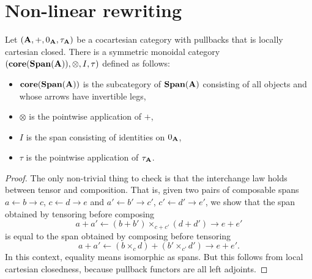 \documentclass[master]{subfiles}
\begin{document}
         

\section{Non-linear rewriting} 
\label{sec_nonlinear-rewriting}


\begin{lem} \label{thm_nlr_dble-rewrite-obcat}
	Let $ (\mathbf{A} , + , 0_{\mathbf{A}} , \tau_{\mathbf{A}} ) $ be a cocartesian category with pullbacks that is locally cartesian closed. There is a symmetric monoidal category $ ( \mathbf{core} (\mathbf{Span} (\mathbf{A})) , \otimes , I , \tau ) $ defined as follows:
	\begin{itemize}
		\item $ \mathbf{core} (\mathbf{Span} (\mathbf{A})) $ is the subcategory of $ \mathbf{Span} (\mathbf{A}) $ consisting of all objects and whose arrows have invertible legs,
		\item $ \otimes $ is the pointwise application of $ + $,
		\item $ I $ is the span consisting of identities on $ 0_{\mathbf{A}} $,
		\item $ \tau $ is the pointwise application of $ \tau_{\mathbf{A}} $.
	\end{itemize}	
\end{lem}
\begin{proof}
	The only non-trivial thing to check is that the interchange law holds between tensor and composition.  That is, given two pairs of composable spans $ a \gets b \to c $, $ c \gets d \to e $ and $ a' \gets b' \to c' $, $ c' \gets d' \to e' $, we show that the span obtained by tensoring before composing 
	\[
	a + a' \gets
	(b + b') \times_{c + c'} (d + d') \to
	e + e'
	\]
	is equal to the span obtained by composing before tensoring
	\[
	a + a' \gets
	(b \times_{c} d) + (b' \times_{c'} d') \to
	e + e'.
	\]
	In this context, equality means isomorphic as spans. But this follows from local cartesian closedness, because pullback functors are all left adjoints.
\end{proof}
\end{document}
